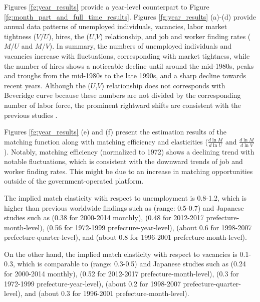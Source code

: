 \documentclass[12pt]{article}
\begin{document}
Figures \ref{fg:year_results} provide a year-level counterpart to Figure \ref{fg:month_part_and_full_time_results}. Figures \ref{fg:year_results} (a)-(d) provide annual data patterns of unemployed individuals, vacancies, labor market tightness (\(V/U\)), hires, the  ($U$,$V$) relationship, and job and worker finding rates (\(M/U\) and \(M/V\)). In summary, the numbers of unemployed individuals and vacancies increase with fluctuations, corresponding with market tightness, while the number of hires shows a noticeable decline until around the mid-1980s, peaks and troughs from the mid-1980s to the late 1990s, and a sharp decline towards recent years.
Although the ($U$,$V$) relationship does not corresponds with Beveridge curve because these numbers are not divided by the corresponding number of labor force, the prominent rightward shifts are consistent with the previous studies \citep{elsby2015beveridge}.

Figures \ref{fg:year_results} (e) and (f) present the estimation results of the matching function along with matching efficiency and elasticities (\(\frac{d\ln M}{d\ln U}\) and \(\frac{d\ln M}{d\ln V}\)). Notably, matching efficiency (normalized to 1972) shows a declining trend with notable fluctuations, which is consistent with the downward trends of job and worker finding rates. This might be due to an increase in matching opportunities outside of the government-operated platform.

The implied match elasticity with respect to unemployment is 0.8-1.2, which is higher than previous worldwide findings such as \cite{petrongolo2001looking} (range: 0.5-0.7) and Japanese studies such as \cite{higashi2018spatial} (0.38 for 2000-2014 monthly), \cite{kawata2019} (0.48 for 2012-2017 prefecture-month-level), \cite{kano2005estimating} (0.56 for 1972-1999 prefecture-year-level), \cite{sasaki2007measuring} (about 0.6 for 1998-2007 prefecture-quarter-level), and \cite{kambayashi2006vacancy} (about 0.8 for 1996-2001 prefecture-month-level). 

On the other hand, the implied match elasticity with respect to vacancies is 0.1-0.3, which is comparable to \cite{lange2020beyond} (range: 0.3-0.5) and Japanese studies such as \cite{higashi2018spatial} (0.24 for 2000-2014 monthly), \cite{kawata2019} (0.52 for 2012-2017 prefecture-month-level), \cite{kano2005estimating} (0.3 for 1972-1999 prefecture-year-level), \cite{sasaki2007measuring} (about 0.2 for 1998-2007 prefecture-quarter-level), and \cite{kambayashi2006vacancy} (about 0.3 for 1996-2001 prefecture-month-level).
\end{document}
